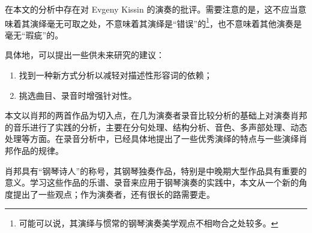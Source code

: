     在本文的分析中存在对 Evgeny Kissin 的演奏的批评。需要注意的是，这不应当意味着其演绎毫无可取之处，不意味着其演绎是“错误”的\footnote{可能可以说，其演绎与惯常的钢琴演奏美学观点不相吻合之处较多。}，也不意味着其他演奏是毫无“瑕疵”的。

    具体地，可以提出一些供未来研究的建议：
    \begin{enumerate}
        \item 找到一种新方式分析以减轻对描述性形容词的依赖；
        \item 挑选曲目、录音时增强针对性。
    \end{enumerate}

    本文以肖邦的两首作品为切入点，在几为演奏者录音比较分析的基础上对演奏肖邦的音乐进行了实践的分析，主要在分句处理、结构分析、音色、多声部处理、动态处理等方面。在录音分析中，已经具体地提出了一些优秀演绎的特点与一些演绎肖邦作品的规律。

    肖邦具有“钢琴诗人”的称号，其钢琴独奏作品，特别是中晚期大型作品具有重要的意义。学习这些作品的乐谱、录音来应用于钢琴演奏的实践中，本文从一个新的角度提出了一些观点；作为演奏者，还有很长的路需要走。





